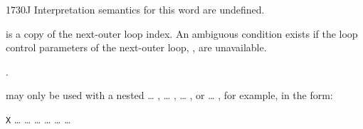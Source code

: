 \begin{worddef}{1730}{J}
\interpret
	Interpretation semantics for this word are undefined.

\execute

	 is a copy of the next-outer loop index. An
	ambiguous condition exists if the loop control parameters of
	the next-outer loop, , are unavailable.

\see {}.

	\begin{rationale} %
		 may only be used with a nested
		 {\ldots} ,
		 {\ldots} ,
		 {\ldots} , or
		 {\ldots} ,
		for example, in the form:

		\tab \word{:} \texttt{X}
			{\ldots} 
				{\ldots} 
					{\ldots}  {\ldots}
			{\ldots} 
		{\ldots} \word{;}
	\end{rationale}

	\begin{testing} %
		 \\
		 \\
		 \\

		 \\
		 \\
		 \\
	\end{testing}
\end{worddef}



